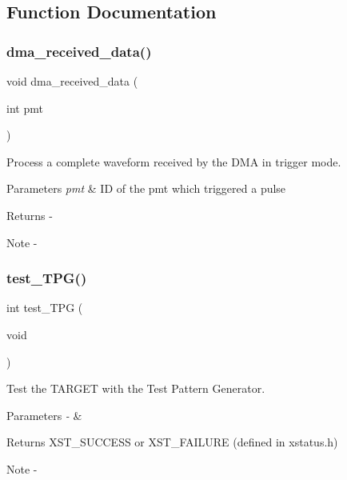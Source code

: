 \subsection{Function Documentation}
\mbox{\label{axis__peripheral_8c_ac643f94e9731b6cb46c9c2897887a0d4}} 
\subsubsection{dma\_received\_data()}
{\footnotesize\ttfamily void dma\+\_\+received\+\_\+data (\begin{DoxyParamCaption}\item[{int}]{pmt }\end{DoxyParamCaption})}



Process a complete waveform received by the D\+MA in trigger mode. 


\begin{DoxyParams}{Parameters}
{\em pmt} & ID of the pmt which triggered a pulse\\
\hline
\end{DoxyParams}
\begin{DoxyReturn}{Returns}
-\/
\end{DoxyReturn}
\begin{DoxyNote}{Note}
-\/ 
\end{DoxyNote}
\mbox{\label{axis__peripheral_8c_afc766563120c4048da238dee8ac2ea49}} 
\subsubsection{test\_TPG()}
{\footnotesize\ttfamily int test\+\_\+\+T\+PG (\begin{DoxyParamCaption}\item[{void}]{ }\end{DoxyParamCaption})}



Test the T\+A\+R\+G\+ET with the Test Pattern Generator. 


\begin{DoxyParams}{Parameters}
{\em -\/} & \\
\hline
\end{DoxyParams}
\begin{DoxyReturn}{Returns}
X\+S\+T\+\_\+\+S\+U\+C\+C\+E\+SS or X\+S\+T\+\_\+\+F\+A\+I\+L\+U\+RE (defined in xstatus.\+h)
\end{DoxyReturn}
\begin{DoxyNote}{Note}
-\/ 
\end{DoxyNote}
\mbox{\label{axis__peripheral_8c_aec2c436529dde9db3cac39062e46cce4}} 
